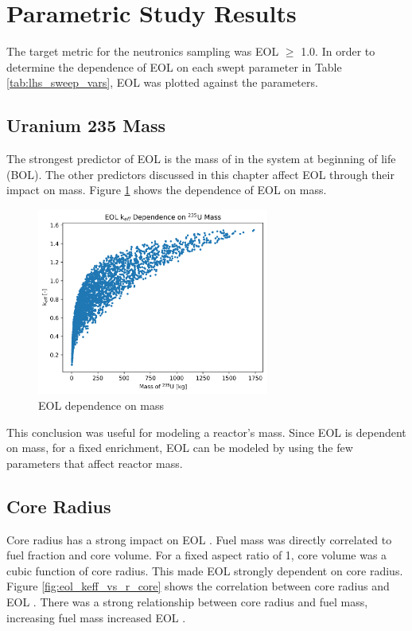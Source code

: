 \section{Parametric Study Results}
The target metric for the neutronics sampling was EOL \keff $\geq$ 1.0. In
order to determine the dependence of EOL \keff on each swept parameter in Table
\ref{tab:lhs_sweep_vars}, EOL \keff was plotted against the parameters.

\subsection{Uranium 235 Mass}
The strongest predictor of EOL \keff is the mass of \uran
in the system at beginning of life (BOL). The other predictors discussed 
in this chapter affect EOL \keff
through their impact on \uran mass. Figure \ref{fig:eol_keff_vs_235_mass} 
shows the dependence of EOL \keff on \uran mass.

\begin{figure}[h]
    \centering
    \includegraphics[width=3in]{../images/keff_vs_mass_235.png}
\caption{EOL \keff dependence on \uran mass}
\label{fig:eol_keff_vs_235_mass}
\end{figure}

This conclusion was useful for modeling a reactor's mass. Since EOL \keff is
dependent on \uran mass, for a fixed enrichment, EOL \keff can be modeled by
using the few parameters that affect reactor mass.

\subsection{Core Radius}
Core radius has a strong impact on EOL \keff. Fuel mass was directly correlated
to fuel fraction and core volume. For a fixed aspect ratio of 1, core volume was
a cubic function of core radius. This made EOL \keff strongly dependent on core
radius. Figure \ref{fig:eol_keff_vs_r_core} shows the correlation between 
core radius and EOL \keff. There was a strong relationship between core radius
and fuel mass, increasing fuel mass increased EOL \keff.

